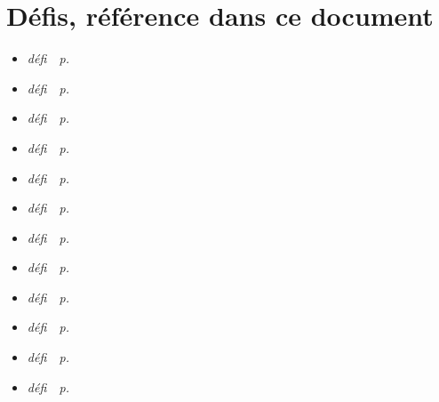 \documentclass[11pt]{article}
\newcommand{\defEnum}[1]{\emph{défi~\cite{#1}~p.~\pageref{#1}}}
\begin{document}


\section*{Défis, référence dans ce document}
\begin{itemize}
\item \defEnum{GLE}
\item \defEnum{reconfiguration}
\item \defEnum{IA}
\item \defEnum{argumentation}
\item \defEnum{compilation}
\item \defEnum{emergents}
\item \defEnum{debuggers}
\item \defEnum{securite}
\item\defEnum{combinatoire}
\item \defEnum{vert}
\item \defEnum{coevolution}
\item \defEnum{Monniaux}
\end{itemize}

\label{vert}


\label{combinatoire}


\label{emergents}



\label{argumentation}


\label{Monniaux}


\label{coevolution}


\label{compilation}


\label{IA}


\label{debuggers}



\label{reconfiguration}


\label{GLE}


\label{securite}

\end{document}
